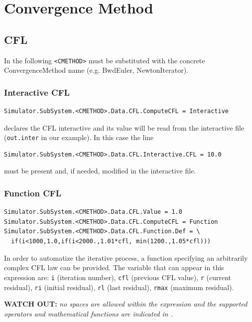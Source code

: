 \documentclass[11pt]{article}
\begin{document}
\section{Convergence Method}

\subsection{CFL}

In the following {\tt <CMETHOD>} must be substituted with the concrete ConvergenceMethod name (e.g. BwdEuler, NewtonIterator).
 
\subsubsection{Interactive CFL}

\begin{verbatim}   
Simulator.SubSystem.<CMETHOD>.Data.CFL.ComputeCFL = Interactive
\end{verbatim}
declares the CFL interactive and its value will be read from the interactive file ({\tt out.inter} in our example).
In this case the line
\begin{verbatim}
Simulator.SubSystem.<CMETHOD>.Data.CFL.Interactive.CFL = 10.0
\end{verbatim}
must be present and, if needed, modified in the interactive file.

\subsubsection{Function CFL}

\begin{verbatim}   
Simulator.SubSystem.<CMETHOD>.Data.CFL.Value = 1.0
Simulator.SubSystem.<CMETHOD>.Data.CFL.ComputeCFL = Function
Simulator.SubSystem.<CMETHOD>.Data.CFL.Function.Def = \
  if(i<1000,1.0,if(i<2000.,1.01*cfl, min(1200.,1.05*cfl)))
\end{verbatim}
In order to automatize the iterative process, a function specifying an arbitrarily complex CFL law can be provided.
The variable that can appear in this expression are: {\tt i} (iteration number), {\tt cfl} (previous CFL value), 
{\tt r} (current residual), {\tt ri} (initial residual), {\tt rl} (last residual), 
{\tt rmax} (maximum residual).

{\bf WATCH OUT:} {\it no spaces are allowed within the expression and the supported operators and mathematical functions
  are indicated in \cite{FParser}.}
\end{document}
